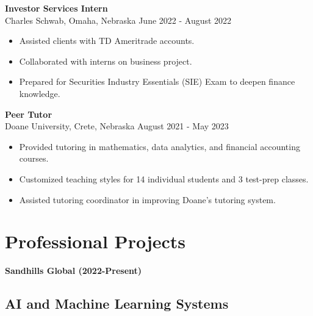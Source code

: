 \documentclass[a4paper,10pt]{article}
\begin{document}
\textbf{Investor Services Intern} \\
Charles Schwab, Omaha, Nebraska \hfill June 2022 - August 2022
\begin{itemize}[noitemsep, topsep=0pt]
    \item Assisted clients with TD Ameritrade accounts.
    \item Collaborated with interns on business project.
    \item Prepared for Securities Industry Essentials (SIE) Exam to deepen finance knowledge.
\end{itemize}
\textbf{Peer Tutor} \\
Doane University, Crete, Nebraska \hfill August 2021 - May 2023
\begin{itemize}[noitemsep, topsep=0pt]
    \item Provided tutoring in mathematics, data analytics, and financial accounting courses.
    \item Customized teaching styles for 14 individual students and 3 test-prep classes.
    \item Assisted tutoring coordinator in improving Doane's tutoring system.
\end{itemize}
\section*{Professional Projects}

\textbf{Sandhills Global (2022-Present)}

\subsection*{AI and Machine Learning Systems}
\end{document}
